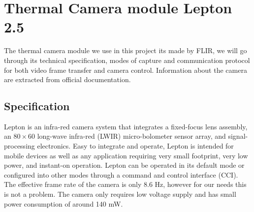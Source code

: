 \section{Thermal Camera module Lepton 2.5}
\label{sec:thermalcamera}
The thermal camera module we use in this project its made by FLIR, we will go
through its technical specification, modes of capture and communication protocol
for both video frame transfer and camera control. Information about the camera
are extracted from official documentation.
%
\subsection{Specification}
\label{ssec:specificationthermalcam}
Lepton is an infra-red camera system that integrates a fixed-focus lens assembly,
an $80 \times 60$ long-wave infra-red (LWIR) micro-bolometer sensor array, and
signal-processing electronics. Easy to integrate and operate, Lepton is intended
for mobile devices as well as any application requiring very small
footprint, very low power, and instant-on operation. Lepton can be operated in
its default mode or configured into other modes through a command and control
interface (CCI). The effective frame rate of the camera is only 8.6 \si{\hertz},
however for our needs this is not a problem. The camera only requires low
voltage supply and has small power consumption of around 140 \si{\milli\watt}.
\begin{figure}[!htb]
    \centering
     \quad
    \label{fig:camerarender}
\end{figure}
%
